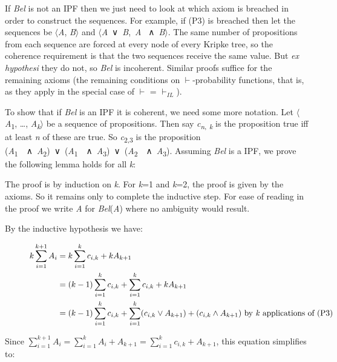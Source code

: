 \documentclass[
  10pt,
  letterpaper,
  DIV=11,
  numbers=noendperiod,
  twoside]{scrartcl}
\begin{document}
If \emph{Bel} is not an IPF then we just need to look at which axiom is
breached in order to construct the sequences. For example, if (P3) is
breached then let the sequences be \(\langle\)\emph{A},
\emph{B}\(\rangle\) and \(\langle\)\emph{A}~∨~\emph{B},~\emph{A}
~∧~\emph{B}\(\rangle\). The same number of propositions from each
sequence are forced at every node of every Kripke tree, so the coherence
requirement is that the two sequences receive the same value. But
\emph{ex hypothesi} they do not, so \emph{Bel} is incoherent. Similar
proofs suffice for the remaining axioms (the remaining conditions on
\(\vdash\)-probability functions, that is, as they apply in the special
case of \(\vdash\) = \(\vdash_{IL}\)).

To show that if \emph{Bel} is an IPF it is coherent, we need some more
notation. Let \(\langle\)\emph{A}\textsubscript{1}, \ldots,
\emph{A}\textsubscript{\emph{k}}\(\rangle\) be a sequence of
propositions. Then say \emph{c\textsubscript{n}}\textsubscript{,}
\textsubscript{\emph{k}} is the proposition true iff at least \emph{n}
of these are true. So \emph{c}\textsubscript{2,3} is the proposition
(\emph{A}\textsubscript{1}~~∧~\emph{A}\textsubscript{2})~∨~(\emph{A}\textsubscript{1}~~∧~\emph{A}\textsubscript{3})~∨~(\emph{A}\textsubscript{2}~~∧~\emph{A}\textsubscript{3}).
Assuming \emph{Bel} is a IPF, we prove the following lemma holds for all
\emph{k}:

The proof is by induction on \emph{k}. For \emph{k}=1 and \emph{k}=2,
the proof is given by the axioms. So it remains only to complete the
inductive step. For ease of reading in the proof we write \emph{A} for
\emph{Bel}(\emph{A}) where no ambiguity would result.

By the inductive hypothesis we have:

\begin{figure}

\begin{align*}
k\sum^{k+1}_{i=1}A_{i} &= k \sum^k_{i=1}c_{i,k} + kA_{k+1} \\
 &= (k-1)\sum_{i=1}^kc_{i,k} + \sum^k_{i=1}c_{i,k} + kA_{k+1} \\
 &= (k-1)\sum_{i=1}^{k}c_{i,k} + \sum^{k}_{i=1}(c_{i,k} \vee A_{k+1}) + (c_{i,k} \wedge A_{k+1}) \text{ by \textit{k} applications of (P3)}
\end{align*}

\end{figure}%

Since
\(\sum_{i=1}^{k+1}A_i = \sum_{i=1}^{k}A_i + A_{k+1} = \sum_{i=1}^{k}c_{i,k} + A_{k+1}\),
this equation simplifies to:
\end{document}

